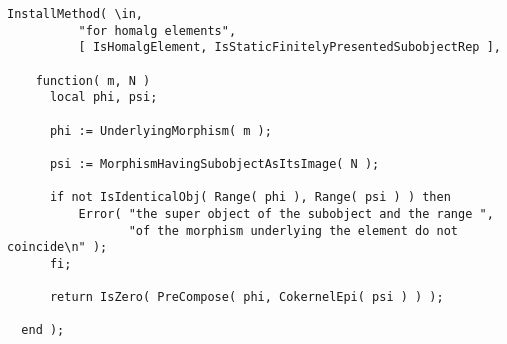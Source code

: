 \documentclass[a4paper,11pt]{report}
\begin{document}
{{{ 
\begin{Verbatim}[fontsize=\small,frame=single,label=Code]
  InstallMethod( \in,
          "for homalg elements",
          [ IsHomalgElement, IsStaticFinitelyPresentedSubobjectRep ],
          
    function( m, N )
      local phi, psi;
      
      phi := UnderlyingMorphism( m );
      
      psi := MorphismHavingSubobjectAsItsImage( N );
      
      if not IsIdenticalObj( Range( phi ), Range( psi ) ) then
          Error( "the super object of the subobject and the range ",
                 "of the morphism underlying the element do not coincide\n" );
      fi;
      
      return IsZero( PreCompose( phi, CokernelEpi( psi ) ) );
      
  end );
\end{Verbatim}
 }

 }

  }

   
\end{document}
